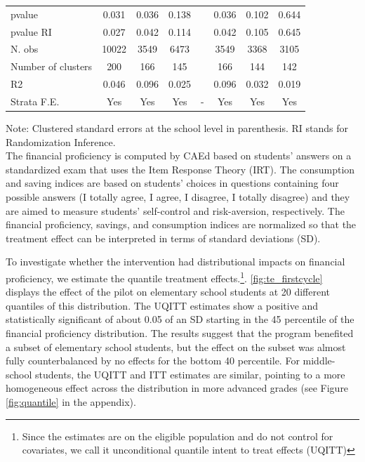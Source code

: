 \begin{table}[h!]
\begin{tabular}{lccccccc}
    pvalue &      0.031 &      0.036 &      0.138 &            &      0.036 &      0.102 &      0.644 \\

 pvalue RI &      0.027 &      0.042 &      0.114 &            &      0.042 &      0.105 &      0.645 \\

    N. obs &      10022 &       3549 &       6473 &            &       3549 &       3368 &       3105 \\

Number of clusters &        200 &        166 &        145 &            &        166 &        144 &        142 \\

        R2 &      0.046 &      0.096 &      0.025 &            &      0.096 &      0.032 &      0.019 \\

    Strata F.E. & Yes   & Yes   & Yes   & -     & Yes   & Yes   & Yes \\
    \bottomrule
    \end{tabular}%
\label{tab:ITT}

\begin{tablenotes}
\fontsize{9}{10} \selectfont
    \item Note: Clustered standard errors at the school level in parenthesis. RI stands for Randomization Inference. \\
      The financial proficiency is computed by CAEd based on students' answers on a standardized exam that uses the Item Response Theory (IRT). The consumption and saving indices are based on students’ choices in questions containing four possible answers (I totally agree, I agree, I disagree, I totally disagree) and they are aimed to measure students' self-control and risk-aversion, respectively. The financial proficiency, savings, and consumption indices are normalized so that the treatment effect can be interpreted in terms of standard deviations (SD). 
\end{tablenotes}
\end{table}%



To investigate whether the intervention had distributional impacts on financial proficiency, we estimate the quantile treatment effects.\footnote{Since the estimates are on the eligible population and do not control for covariates, we call it unconditional quantile intent to treat effects (UQITT)}. \autoref{fig:te_firstcycle} displays the effect of the pilot on elementary school students at 20 different quantiles of this distribution. The UQITT estimates show a positive and statistically significant of about 0.05 of an SD starting in the 45 percentile of the financial proficiency distribution. The results suggest that the program benefited a subset of elementary school students, but the effect on the subset was almost fully counterbalanced by no effects for the bottom 40 percentile. For middle-school students, the UQITT and ITT estimates are similar, pointing to a more homogeneous effect across the distribution in more advanced grades (see Figure \ref{fig:quantile} in the appendix). 

